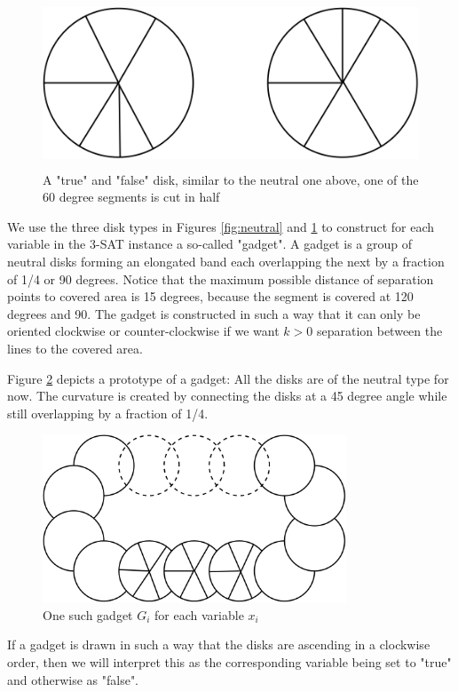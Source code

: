 \documentclass[a4paper,11pt]{article}
\begin{document}
\begin{figure}[h]
  \centering
  \includegraphics[height=5cm]{assets/np-hardness/true_false.png}
  \caption{A "true" and "false" disk, similar to the neutral one above, one of the 60 degree segments is cut in half}
  \label{fig:trueandfalse}
\end{figure}

We use the three disk types in Figures \ref{fig:neutral} and \ref{fig:trueandfalse} to construct for each variable in the 3-SAT instance a so-called "gadget". A gadget is a group of neutral disks forming an elongated band each overlapping the next by a fraction of 1/4 or 90 degrees. Notice that the maximum possible distance of separation points to covered area is 15 degrees, because the segment is covered at 120 degrees and 90. The gadget is constructed in such a way that it can only be oriented clockwise or counter-clockwise if we want $k>0$ separation between the lines to the covered area.

Figure \ref{fig:gadget} depicts a prototype of a gadget: All the disks are of the neutral type for now. The curvature is created by connecting the disks at a 45 degree angle while still overlapping by a fraction of 1/4.

\begin{figure}[H]
  \centering
  \includegraphics[height=5cm]{assets/np-hardness/gadget.png}
  \caption{One such gadget $G_i$ for each variable $x_i$}
  \label{fig:gadget}
\end{figure}

If a gadget is drawn in such a way that the disks are ascending in a clockwise order, then we will interpret this as the corresponding variable being set to "true" and otherwise as "false".
\end{document}
